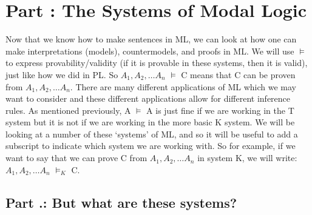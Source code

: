 \chapter{Part \thechapcount: The Systems of Modal Logic}
Now that we know how to make sentences in ML, we can look at how one can make interpretations (models), countermodels, and proofs in ML. We will use $\vDash$  to express provability/validity (if it is provable in these systems, then it is valid), just like how we did in PL. So $A_1,A_2,\ldots A_n$ $\vDash$  C means that C can be proven from $A_1,A_2,\ldots A_n$. There are many different applications of ML which we may want to consider and these different applications allow for different inference rules. As mentioned previously, \ebox A $\vDash$ A is just fine if we are working in the T system but it is not if we are working in the more basic K system. We will be looking at a number of these `systems' of ML, and so it will be useful to add a subscript to indicate which system we are working with. So for example, if we want to say that we can prove C from $A_1,A_2,\ldots A_n$ in system K, we will write: $A_1,A_2,\ldots A_n$ $\vDash_K$ C.

\section{Part \thechapcount.\theseccount: But what are these systems?}\label{ml.systems}

